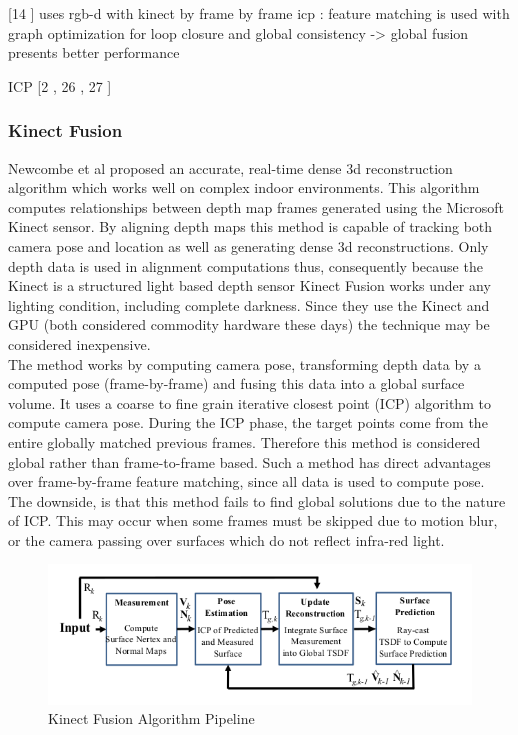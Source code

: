 [14 \cite{Henry10Rgb}] uses rgb-d with kinect by frame by frame icp : feature matching is used with graph optimization for loop closure and global consistency -> global fusion presents better performance



ICP [2 \cite{Besl92Method}, 26 \cite{Rusinkiewicz01Efficient}, 27 \cite{Segal09Generalized}]

\subsubsection{Kinect Fusion}

Newcombe et al \cite{Newcombe11Kinectfusion} proposed an accurate, real-time dense 3d reconstruction algorithm which works well on complex indoor environments. This algorithm computes relationships between depth map frames generated using the Microsoft Kinect \cite{Zhang12Microsoft} sensor. By aligning depth maps this method is capable of tracking both camera pose and location as well as generating dense 3d reconstructions. Only depth data is used in alignment computations thus, consequently because the Kinect is a structured light based depth sensor Kinect Fusion works under any lighting condition, including complete darkness. Since they use the Kinect and GPU (both considered commodity hardware these days) the technique may be considered inexpensive. \\

The method works by computing camera pose, transforming depth data by a computed pose (frame-by-frame) and fusing this data into a global surface volume. It uses a coarse to fine grain iterative closest point (ICP) algorithm to compute camera pose. During the ICP phase, the target points come from the entire globally matched previous frames. Therefore this method is considered global rather than frame-to-frame based. Such a method has direct advantages over frame-by-frame feature matching, since all data is used to compute pose. The downside, is that this method fails to find global solutions due to the nature of ICP. This may occur when some frames must be skipped due to motion blur, or the camera passing over surfaces which do not reflect infra-red light. \\

\begin{figure}[!h]
\centering
\includegraphics[width=12cm]{images/ch1/Newcombe11KinectFusion1}
\caption{Kinect Fusion Algorithm Pipeline \cite{Newcombe11Kinectfusion}}
\label{KFusionPipeliciteHne}
\end{figure}

